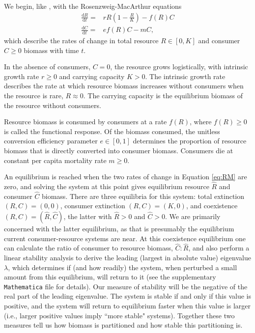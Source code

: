 \documentclass[letter,12pt]{article}
\begin{document}
We begin, like \cite{Gilbert2014}, with the Rosenzweig-MacArthur equations \cite{Rosenzweig1963}
\begin{equation}\label{eq:RM}
\begin{aligned}
\frac{\mathrm{d}R}{\mathrm{d}t} =& r R \left(1 - \frac{R}{K} \right) - f(R) C\\
\frac{\mathrm{d}C}{\mathrm{d}t} =& e f(R) C - m C,
\end{aligned}
\end{equation}
which describe the rates of change in total resource $R\in[0,K]$ and consumer $C\geq0$ biomass with time $t$.

In the absence of consumers, $C=0$, the resource grows logistically, with intrinsic growth rate $r\geq0$ and carrying capacity $K>0$.
The intrinsic growth rate describes the rate at which resource biomass increases without consumers when the resource is rare, $R\approx0$.
The carrying capacity is the equilibrium biomass of the resource without consumers.

Resource biomass is consumed by consumers at a rate $f(R)$, where $f(R)\geq0$ is called the functional response.
Of the biomass consumed, the unitless conversion efficiency parameter $e\in[0,1]$ determines the proportion of resource biomass that is directly converted into consumer biomass.
Consumers die at constant per capita mortality rate $m\geq0$.

An equilibrium is reached when the two rates of change in Equation \eqref{eq:RM} are zero, and solving the system at this point gives equilibrium resource $\hat{R}$ and consumer $\hat{C}$ biomass.
There are three equilibria for this system: total extinction $(R,C) = (0,0)$, consumer extinction $(R,C)=(K,0)$, and coexistence $(R,C)=(\hat{R},\hat{C})$, the latter with $\hat{R}>0$ and $\hat{C}>0$.
We are primarily concerned with the latter equilibrium, as that is presumably the equilibrium current consumer-resource systems are near.
At this coexistence equilibrium one can calculate the ratio of consumer to resource biomass, $\hat{C}:\hat{R}$, and also perform a linear stability analysis to derive the leading (largest in absolute value) eigenvalue $\lambda$, which determines if (and how readily) the system, when perturbed a small amount from this equilibrium, will return to it (see the supplementary \texttt{Mathematica} file for details).
Our measure of stability will be the negative of the real part of the leading eigenvalue.
The system is stable if and only if this value is positive, and the system will return to equilibrium faster when this value is larger (i.e., larger positive values imply ``more stable" systems).
Together these two measures tell us how biomass is partitioned and how stable this partitioning is.
\end{document}
